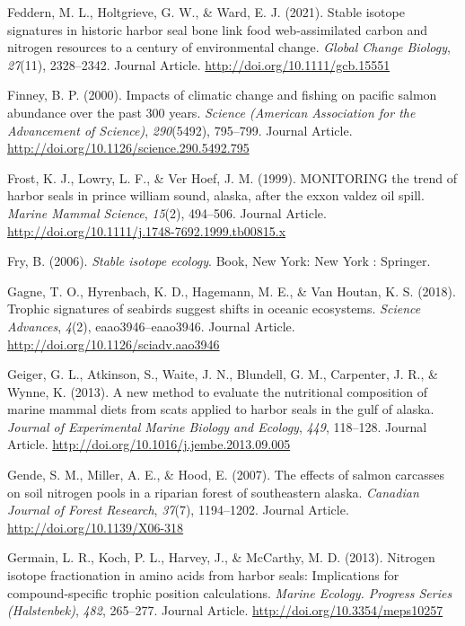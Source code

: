 \documentclass [11pt, proquest] {uwthesis}[2015/03/03]
\begin{document}
\hypertarget{ref-Feddern2021}{}
Feddern, M. L., Holtgrieve, G. W., \& Ward, E. J. (2021). Stable isotope
signatures in historic harbor seal bone link food web‐assimilated carbon
and nitrogen resources to a century of environmental change.
\emph{Global Change Biology}, \emph{27}(11), 2328--2342. Journal
Article. \url{http://doi.org/10.1111/gcb.15551}

\hypertarget{ref-Finney2000}{}
Finney, B. P. (2000). Impacts of climatic change and fishing on pacific
salmon abundance over the past 300 years. \emph{Science (American
Association for the Advancement of Science)}, \emph{290}(5492),
795--799. Journal Article.
\url{http://doi.org/10.1126/science.290.5492.795}

\hypertarget{ref-Frost1999}{}
Frost, K. J., Lowry, L. F., \& Ver Hoef, J. M. (1999). MONITORING the
trend of harbor seals in prince william sound, alaska, after the exxon
valdez oil spill. \emph{Marine Mammal Science}, \emph{15}(2), 494--506.
Journal Article. \url{http://doi.org/10.1111/j.1748-7692.1999.tb00815.x}

\hypertarget{ref-Fry2006}{}
Fry, B. (2006). \emph{Stable isotope ecology}. Book, New York: New York
: Springer.

\hypertarget{ref-Gagne2018}{}
Gagne, T. O., Hyrenbach, K. D., Hagemann, M. E., \& Van Houtan, K. S.
(2018). Trophic signatures of seabirds suggest shifts in oceanic
ecosystems. \emph{Science Advances}, \emph{4}(2), eaao3946--eaao3946.
Journal Article. \url{http://doi.org/10.1126/sciadv.aao3946}

\hypertarget{ref-Geiger2013}{}
Geiger, G. L., Atkinson, S., Waite, J. N., Blundell, G. M., Carpenter,
J. R., \& Wynne, K. (2013). A new method to evaluate the nutritional
composition of marine mammal diets from scats applied to harbor seals in
the gulf of alaska. \emph{Journal of Experimental Marine Biology and
Ecology}, \emph{449}, 118--128. Journal Article.
\url{http://doi.org/10.1016/j.jembe.2013.09.005}

\hypertarget{ref-Gende2007}{}
Gende, S. M., Miller, A. E., \& Hood, E. (2007). The effects of salmon
carcasses on soil nitrogen pools in a riparian forest of southeastern
alaska. \emph{Canadian Journal of Forest Research}, \emph{37}(7),
1194--1202. Journal Article. \url{http://doi.org/10.1139/X06-318}

\hypertarget{ref-Germain2013}{}
Germain, L. R., Koch, P. L., Harvey, J., \& McCarthy, M. D. (2013).
Nitrogen isotope fractionation in amino acids from harbor seals:
Implications for compound-specific trophic position calculations.
\emph{Marine Ecology. Progress Series (Halstenbek)}, \emph{482},
265--277. Journal Article. \url{http://doi.org/10.3354/meps10257}
\end{document}
